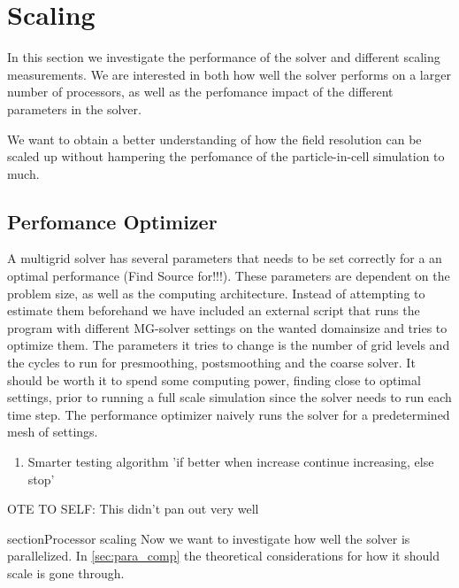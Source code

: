 \section{Scaling}
  In this section we investigate the performance of the solver and different scaling
  measurements. We are interested in both how well the solver performs on a larger
  number of processors, as well as the perfomance impact of the different
  parameters in the solver.

  We want to obtain a better understanding of how the field resolution can be scaled
  up without hampering the perfomance of the particle-in-cell simulation to much.

  \subsection{Perfomance Optimizer}
    A multigrid solver has several parameters that needs to be set correctly for
    a an optimal performance (Find Source for!!!). These parameters are dependent on the problem size,
    as well as the computing architecture. Instead of attempting to estimate them beforehand
    we have included an external script that runs the program with different MG-solver
    settings on the wanted domainsize and tries to optimize them.
    The parameters it tries to change is the number of grid levels and the cycles
    to run for presmoothing, postsmoothing and the coarse solver. It should be worth it
    to spend some computing power, finding close to optimal settings,  prior to
    running a full scale simulation since the solver needs to run each time step.
    The performance optimizer naively runs the solver for a predetermined mesh of
    settings.

    \begin{enumerate}
      \item Smarter testing algorithm 'if better when increase continue increasing, else stop'
    \end{enumerate}

  OTE TO SELF: This didn't pan out very well

  section{Processor scaling}
  Now we want to investigate how well the solver is parallelized. In \cref{sec:para_comp}
  the theoretical considerations for how it should scale is gone through.
